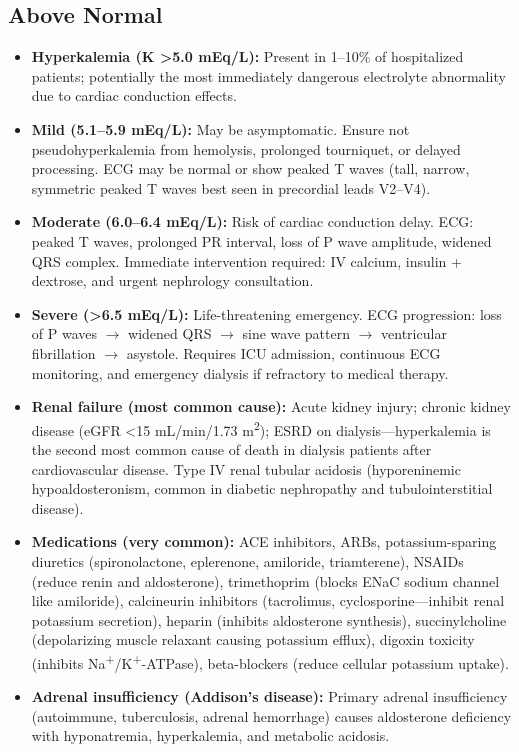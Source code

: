 \subsection*{Above Normal}
\begin{itemize}
  \item \textbf{Hyperkalemia (K >5.0 mEq/L):} Present in 1--10\% of hospitalized patients; potentially the most immediately dangerous electrolyte abnormality due to cardiac conduction effects.
  \item \textbf{Mild (5.1--5.9 mEq/L):} May be asymptomatic. Ensure not pseudohyperkalemia from hemolysis, prolonged tourniquet, or delayed processing. ECG may be normal or show peaked T waves (tall, narrow, symmetric peaked T waves best seen in precordial leads V2--V4).
  \item \textbf{Moderate (6.0--6.4 mEq/L):} Risk of cardiac conduction delay. ECG: peaked T waves, prolonged PR interval, loss of P wave amplitude, widened QRS complex. Immediate intervention required: IV calcium, insulin + dextrose, and urgent nephrology consultation.
  \item \textbf{Severe (>6.5 mEq/L):} Life-threatening emergency. ECG progression: loss of P waves $\rightarrow$ widened QRS $\rightarrow$ sine wave pattern $\rightarrow$ ventricular fibrillation $\rightarrow$ asystole. Requires ICU admission, continuous ECG monitoring, and emergency dialysis if refractory to medical therapy.
  \item \textbf{Renal failure (most common cause):} Acute kidney injury; chronic kidney disease (eGFR <15 mL/min/1.73 m\textsuperscript{2}); ESRD on dialysis---hyperkalemia is the second most common cause of death in dialysis patients after cardiovascular disease. Type IV renal tubular acidosis (hyporeninemic hypoaldosteronism, common in diabetic nephropathy and tubulointerstitial disease).
  \item \textbf{Medications (very common):} ACE inhibitors, ARBs, potassium-sparing diuretics (spironolactone, eplerenone, amiloride, triamterene), NSAIDs (reduce renin and aldosterone), trimethoprim (blocks ENaC sodium channel like amiloride), calcineurin inhibitors (tacrolimus, cyclosporine---inhibit renal potassium secretion), heparin (inhibits aldosterone synthesis), succinylcholine (depolarizing muscle relaxant causing potassium efflux), digoxin toxicity (inhibits Na\textsuperscript{+}/K\textsuperscript{+}-ATPase), beta-blockers (reduce cellular potassium uptake).
  \item \textbf{Adrenal insufficiency (Addison's disease):} Primary adrenal insufficiency (autoimmune, tuberculosis, adrenal hemorrhage) causes aldosterone deficiency with hyponatremia, hyperkalemia, and metabolic acidosis.

\end{itemize}
